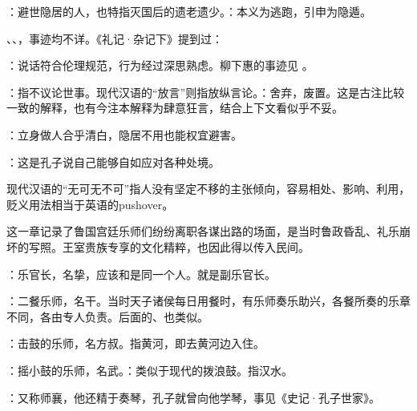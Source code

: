 {
\item {}：避世隐居的人，也特指灭国后的遗老遗少。：本义为逃跑，引申为隐遁。
\item {}、、，事迹均不详。《礼记·杂记下》提到过：
\item {}：说话符合伦理规范，行为经过深思熟虑。柳下惠的事迹见 。
\item {}：指不议论世事。现代汉语的“放言”则指放纵言论。：舍弃，废置。这是古注比较一致的解释，也有今注本解释为肆意狂言，结合上下文看似乎不妥。
\item {}：立身做人合乎清白，隐居不用也能权宜避害。
\item {}：这是孔子说自己能够自如应对各种处境。

现代汉语的“无可无不可”指人没有坚定不移的主张倾向，容易相处、影响、利用，贬义用法相当于英语的pushover。 %
}
{}


{
这一章记录了鲁国宫廷乐师们纷纷离职各谋出路的场面，是当时鲁政昏乱、礼乐崩坏的写照。王室贵族专享的文化精粹，也因此得以传入民间。
\begin{lyblobitemize}
\item {}：乐官长，名挚，应该和是同一个人。就是副乐官长。
\item {}：二餐乐师，名干。当时天子诸侯每日用餐时，有乐师奏乐助兴，各餐所奏的乐章不同，各由专人负责。后面的、也类似。
\item {}：击鼓的乐师，名方叔。指黄河，即去黄河边入住。
\item {}：摇小鼓的乐师，名武。：类似于现代的拨浪鼓。指汉水。
\item {}：又称师襄，他还精于奏琴，孔子就曾向他学琴，事见《史记·孔子世家》。
\end{lyblobitemize}
}
{}


